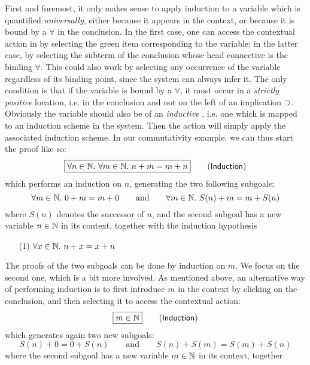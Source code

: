 First and foremost, it only makes sense to apply induction to a variable which
is quantified \emph{universally}, either because it appears in the context, or
because it is bound by a $\forall$ in the conclusion. In the first case, one can
access the contextual action in  by selecting the green item corresponding
to the variable; in the latter case, by selecting the subterm of the conclusion
whose head connective is the binding $\forall$. This could also work by selecting any
occurrence of the variable regardless of its binding point, since the system can
always infer it. The only condition is that if the variable is bound by a
$\forall$, it must occur in a \emph{strictly positive} location, i.e. in the
conclusion and not on the left of an implication $\supset$. Obviously the variable
should also be of an \emph{inductive} , i.e. one which is mapped to an
induction scheme in the system. Then the 
action will simply apply the associated induction scheme. In our commutativity
example, we can thus start the proof like so:
$$\fbox{$\forall n \in \mathbb{N}.\ \forall m \in \mathbb{N}.\ n + m = m + n$} \qquad
\text{(\textsf{Induction})}$$
which performs an induction on $n$, generating the two following subgoals:
$$\forall m \in \mathbb{N}.\ 0 + m = m + 0 \qquad \text{and} \qquad \forall m \in \mathbb{N}.\ S(n) + m = m + S(n)$$
where $S(n)$ denotes the successor of $n$, and the second subgoal has a new
variable $n \in \mathbb{N}$ in its context, together with the induction hypothesis
\begin{itemize}
  \item[(1)] $\forall x \in \mathbb{N}.\ n + x = x + n$
\end{itemize}
The proofs of the two subgoals can be done by induction on $m$. We focus on the
second one, which is a bit more involved. As mentioned above, an alternative way
of performing induction is to first introduce $m$ in the context by clicking on
the conclusion, and then selecting it to access the contextual action:
$$\fbox{$m \in \mathbb{N}$} \qquad \text{(\textsf{Induction})}$$
which generates again two new subgoals:
$$S(n) + 0 = 0 + S(n) \qquad \text{and} \qquad S(n) + S(m) = S(m) + S(n)$$ where
the second subgoal has a new variable $m \in \mathbb{N}$ in its context, together
